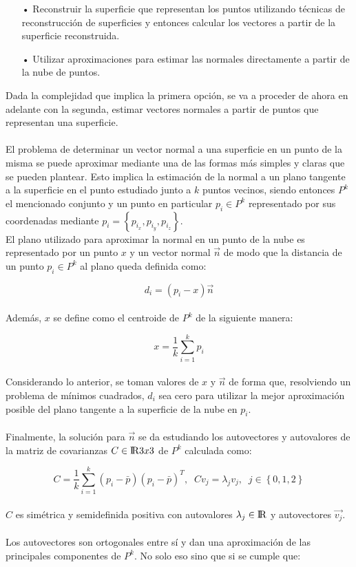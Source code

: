 \begin{itemize}
\item[•]Reconstruir la superficie que representan los puntos utilizando técnicas de reconstrucción de superficies y entonces calcular los vectores a partir de la superficie reconstruida.
\item[•]Utilizar aproximaciones para estimar las normales directamente a partir de la nube de puntos.
\end{itemize}

Dada la complejidad que implica la primera opción, se va a proceder de ahora en adelante con la segunda, estimar vectores normales a partir de puntos que representan una superficie.
\\
\\
El problema de determinar un vector normal a una superficie en un punto de la misma se puede aproximar mediante una de las formas más simples y claras que se pueden plantear. Esto implica la estimación de la normal a un plano tangente a la superficie en el punto estudiado junto a $k$ puntos vecinos\cite{normales_extra}, siendo entonces $P^k$ el mencionado conjunto y un punto en particular $p_{i} \in P^{k}$ representado por sus coordenadas mediante $p_{i}=\left\lbrace p_{i_x},p_{i_y},p_{i_z} \right\rbrace$.
\\
El plano utilizado para aproximar la normal en un punto de la nube es representado por un punto $x$ y un vector normal $\vec{n}$ de modo que la distancia de un punto $p_{i} \in P^{k}$ al plano queda definida como:

$$d_i=(p_{i}-x)\vec{n}$$
\\
Además, $x$ se define como el centroide de $P^{k}$ de la siguiente manera:

$$x=\frac{1}{k}\sum_{i=1}^{k} p_i$$
\\
Considerando lo anterior, se toman valores de $x$ y $\vec{n}$ de forma que, resolviendo un problema de mínimos cuadrados, $d_i$ sea cero para utilizar la mejor aproximación posible del plano tangente a la superficie de la nube en $p_i$.
\\
\\
Finalmente, la solución para $\vec{n}$ se da estudiando los autovectores y autovalores de la matriz de covarianzas $C \in {\rm I\!R} 3x3$ de $P^{k}$ calculada como:

$$C=\frac{1}{k}\sum_{i=1}^{k} (p_i-\bar{p})(p_i-\bar{p})^T,\;\;Cv_{j}=\lambda_{j}v_{j},\;\;j \in \left\lbrace 0,1,2 \right\rbrace$$
\\
$C$ es simétrica y semidefinida positiva con autovalores $\lambda_j \in {\rm I\!R} $ y autovectores $\vec{v_j}$.
\\
\\
Los autovectores son ortogonales entre sí y dan una aproximación de las principales componentes de $P^k$. No solo eso sino que si se cumple que:
 
